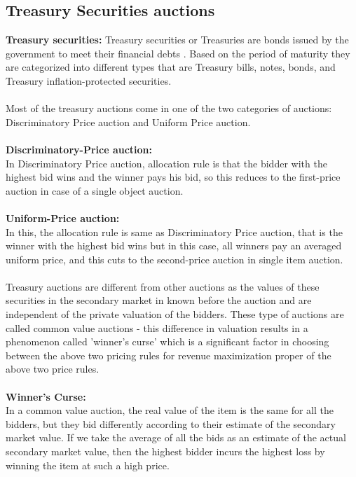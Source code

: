 \documentclass[a4paper]{article}
\begin{document}
\subsection*{Treasury Securities auctions \cite{treasury} }

\textbf{Treasury securities:} Treasury securities or Treasuries are bonds issued by the government to meet their financial debts \cite{rbi}. Based on the period of maturity they are categorized into different types that are Treasury bills, notes, bonds, and Treasury inflation-protected securities.
\\\\
Most of the treasury auctions come in one of the two categories of auctions: Discriminatory Price auction and Uniform Price auction.
\\\\
\textbf{Discriminatory-Price auction:} \\In Discriminatory Price auction, allocation rule is that the bidder with the highest bid wins and the winner pays his bid, so this reduces to the first-price auction in case of a single object auction.
\\\\
\textbf{Uniform-Price auction:} \\In this, the allocation rule is same as Discriminatory Price auction, that is the winner with the highest bid wins but in this case, all winners pay an averaged uniform price, and this cuts to the second-price auction in single item auction.
\\\\
Treasury auctions are different from other auctions as the values of these securities in the secondary market in known before the auction and are independent of the private valuation of the bidders. These type of auctions are called common value auctions - this difference in valuation results in a phenomenon called 'winner's curse' which is a significant factor in choosing between the above two pricing rules for revenue maximization proper of the above two price rules.
\\\\
\textbf{Winner's Curse:}\\ In a common value auction, the real value of the item is the same for all the bidders, but they bid differently according to their estimate of the secondary market value. If we take the average of all the bids as an estimate of the actual secondary market value, then the highest bidder incurs the highest loss by winning the item at such a high price.
\end{document}
